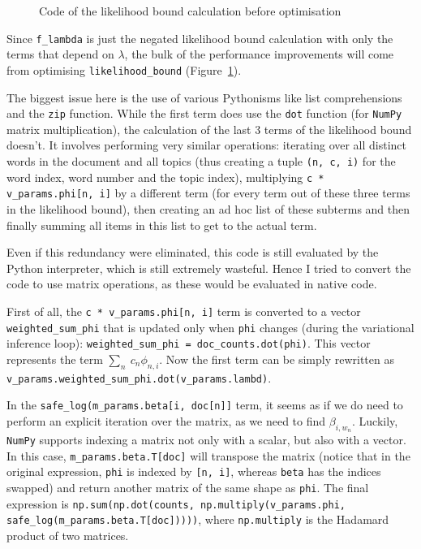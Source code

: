 \documentclass[12pt,a4paper,twoside,openright]{report}
\begin{document}
\begin{figure}
\caption{Code of the likelihood bound calculation before optimisation}
\label{fig:code-before-optimisation}
\end{figure}

Since \texttt{f\_lambda} is just the negated likelihood bound calculation with only the terms that depend on $\lambda$, the bulk of the performance improvements will come from optimising \texttt{likelihood\_bound} (Figure~\ref{fig:code-before-optimisation}).

The biggest issue here is the use of various Pythonisms like list comprehensions and the \texttt{zip} function. While the first term does use the \texttt{dot} function (for \texttt{NumPy} matrix multiplication), the calculation of the last 3 terms of the likelihood bound doesn't. It involves performing very similar operations: iterating over all distinct words in the document and all topics (thus creating a tuple \texttt{(n, c, i)} for the word index, word number and the topic index), multiplying \texttt{c * v\_params.phi[n, i]} by a different term (for every term out of these three terms in the likelihood bound), then creating an ad hoc list of these subterms and then finally summing all items in this list to get to the actual term.

Even if this redundancy were eliminated, this code is still evaluated by the Python interpreter, which is still extremely wasteful. Hence I tried to convert the code to use matrix operations, as these would be evaluated in native code.

First of all, the \texttt{c * v\_params.phi[n, i]} term is converted to a vector \texttt{weighted\_sum\_phi} that is updated only when \texttt{phi} changes (during the variational inference loop): \texttt{weighted\_sum\_phi = doc\_counts.dot(phi)}. This vector represents the term $\sum\limits_n\ c_n\phi_{n, i}$. Now the first term can be simply rewritten as \texttt{v\_params.weighted\_sum\_phi.dot(v\_params.lambd)}.

In the \texttt{safe\_log(m\_params.beta[i, doc[n]]} term, it seems as if we do need to perform an explicit iteration over the matrix, as we need to find $\beta_{i, w_n}$. Luckily, \texttt{NumPy} supports indexing a matrix not only with a scalar, but also with a vector. In this case, \texttt{m\_params.beta.T[doc]} will transpose the matrix (notice that in the original expression, \texttt{phi} is indexed by \texttt{[n, i]}, whereas \texttt{beta} has the indices swapped) and return another matrix of the same shape as \texttt{phi}. The final expression is \texttt{np.sum(np.dot(counts, np.multiply(v\_params.phi, safe\_log(m\_params.beta.T[doc]))))}, where \texttt{np.multiply} is the Hadamard product of two matrices.
\end{document}
